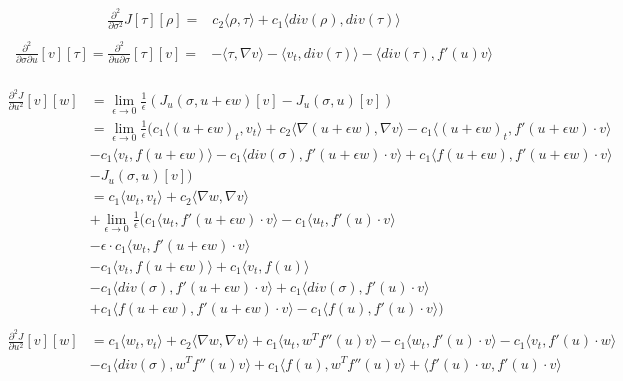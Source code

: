 \documentclass[fleqn, a4paper, 11pt, bibliography=totoc]{report}
\begin{document}
\begin{equation}
\begin{aligned}
\frac{\partial^2}{\partial \sigma^2} J [\tau] [\rho] =& c_2 \langle \rho, \tau \rangle + c_1 \langle div(\rho), div(\tau) \rangle  \\
\end{aligned}
\end{equation}
\begin{equation}
\begin{aligned}
\frac{\partial^2}{\partial \sigma \partial u} [v][\tau] = \frac{\partial^2 }{\partial u \partial \sigma} [\tau] [v]=& - \langle \tau, \nabla v \rangle - \langle v_t, div(\tau) \rangle - \langle div(\tau), f'(u) v \rangle \\
\end{aligned}
\end{equation}

\begin{equation}
\begin{aligned}
\frac{\partial^2 J}{\partial u^2} [v][w]&= \lim_{\epsilon \rightarrow 0} \frac{1}{\epsilon} (J_u(\sigma, u+ \epsilon w)[v] - J_u(\sigma, u)[v]) \\
&= \lim_{\epsilon \rightarrow 0} \frac{1}{\epsilon} ( c_1 \langle (u + \epsilon w)_t, v_t \rangle + c_2 \langle \nabla (u + \epsilon w), \nabla v \rangle - c_1 \langle (u + \epsilon w)_t, f'(u + \epsilon w) \cdot v \rangle \\
&- c_1 \langle v_t, f(u + \epsilon w) \rangle - c_1 \langle div(\sigma), f'(u + \epsilon w) \cdot v \rangle + c_1 \langle f(u + \epsilon w), f'(u + \epsilon w) \cdot v \rangle  \\
&- J_u(\sigma, u)[v]) \\
&= c_1 \langle w_t, v_t \rangle + c_2 \langle \nabla w, \nabla v \rangle \\
&+ \lim_{\epsilon \rightarrow 0} \frac{1}{\epsilon}  (c_1 \langle u_t, f'(u+ \epsilon w) \cdot v \rangle - c_1  \langle u_t, f'(u) \cdot v \rangle \\
&- \epsilon \cdot c_1 \langle w_t,  f'(u + \epsilon w) \cdot v \rangle \\
&- c_1 \langle v_t, f(u + \epsilon w) \rangle + c_1 \langle v_t, f(u) \rangle \\
& - c_1 \langle div(\sigma), f'(u + \epsilon w) \cdot v \rangle +  c_1 \langle div(\sigma), f'(u) \cdot v \rangle \\
& +  c_1 \langle f(u + \epsilon w), f'(u + \epsilon w) \cdot v \rangle - c_1 \langle f(u), f'(u) \cdot v \rangle) \\
\\
\frac{\partial^2 J}{\partial u^2} [v][w] &= c_1 \langle w_t, v_t \rangle + c_2 \langle \nabla w, \nabla v \rangle + c_1 \langle u_t, w^T f''(u) v \rangle - c_1 \langle w_t, f'(u) \cdot v \rangle - c_1 \langle v_t, f'(u) \cdot w \rangle \\
& - c_1 \langle div(\sigma), w^T f''(u) v \rangle + c_1 \langle f(u), w^T f''(u) v \rangle + \langle f'(u) \cdot w, f'(u) \cdot v \rangle 
\end{aligned}
\end{equation}
\end{document}
